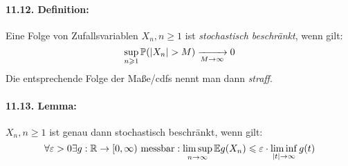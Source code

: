 \paragraph{11.12. Definition:} Eine Folge von Zufallsvariablen $X_n,n\geq 1$ ist \textit{stochastisch beschr\"ankt}, wenn gilt:
$$\sup_{n\geq1}\Pp(|X_n|> M)\nto{}{M\to\infty}0$$
Die entsprechende Folge der Ma\ss{}e/cdfs nennt man dann \textit{straff}.

\paragraph{11.13. Lemma:} $X_n,n\geq1$ ist genau dann stochastisch beschr\"ankt, wenn gilt:
\begin{equation}
    \forall\varepsilon>0\exists g:\mathbb{R}\to[0,\infty)\text{ messbar}:\limsup_{n\to\infty}\mathbb{E} g(X_n)\leqslant\varepsilon\cdot\liminf_{|t|\to\infty}g(t)
\end{equation}

